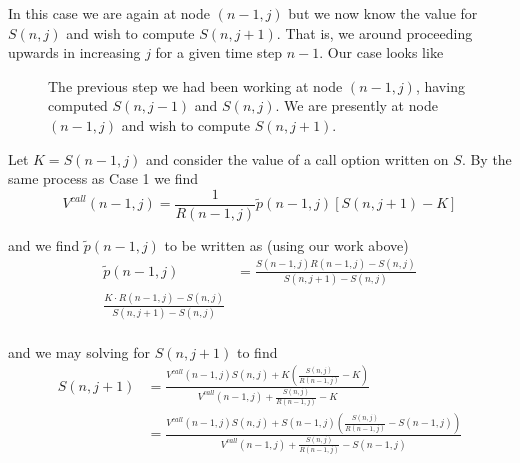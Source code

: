 \documentclass[12pt]{article}
\newlength\tindent
\renewcommand{\indent}{\hspace*{\tindent}}
\begin{document}
In this case we are again at node $(n - 1, j)$ but we now know the value for $S(n, j)$ and wish to compute $S(n, j + 1)$. That is, we around proceeding upwards in increasing $j$ for a given time step $n - 1$. Our case looks like

\begin{figure}[H]
\centering
{}
\caption{The previous step we had been working at node $(n - 1, j)$, having computed $S(n, j - 1)$ and $S(n, j)$. We are presently at node $(n - 1, j)$ and wish to compute $S(n, j + 1)$.}
\end{figure}

\indent Let $K = S(n - 1,j)$ and consider the value of a call option written on $S$. By the same process as Case 1 we find
\begin{equation*}
	V^{call}(n - 1, j) = \frac{1}{R(n - 1, j)} \tilde{p}(n - 1, j)[S(n, j + 1) - K] 
\end{equation*}

and we find $\tilde{p}(n - 1, j)$ to be written as (using our work above)
\begin{align*}
	\tilde{p}(n - 1, j) &=  \frac{ S(n - 1,j)R(n - 1, j) - S(n, j) }{ S(n, j + 1) - S(n, j) } \\
	 \frac{ K \cdot R(n - 1, j) - S(n, j) }{ S(n, j + 1) - S(n, j) } \\
\end{align*}

and we may solving for $S(n, j + 1)$ to find
\begin{align*}
	S(n, j + 1) &= \frac{ V^{call}(n - 1, j) S(n, j) + K \left( \frac{ S(n, j) }{ R(n - 1, j) } - K \right) }{ V^{call}(n - 1, j) + \frac{ S(n, j) }{ R(n - 1, j) } - K } \\
	&= \frac{ V^{call}(n - 1, j) S(n, j) + S(n - 1,j) \left( \frac{ S(n, j) }{ R(n - 1, j) } - S(n - 1,j) \right) }{ V^{call}(n - 1, j) + \frac{ S(n, j) }{ R(n - 1, j) } - S(n - 1,j) } \\
\end{align*}
\end{document}
